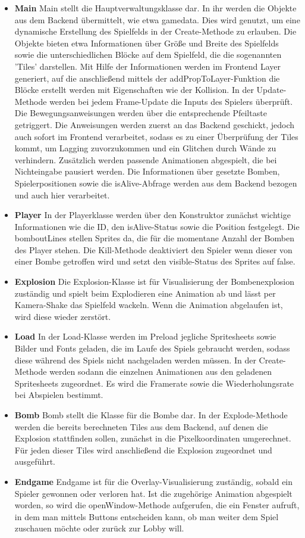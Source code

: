 \documentclass[conference]{IEEEtran}
\begin{document}
\begin{itemize}
    \item \textbf{Main}
    Main stellt die Hauptverwaltungsklasse dar. In ihr werden die Objekte aus dem Backend übermittelt, wie etwa gamedata. Dies wird genutzt, um eine dynamische Erstellung des Spielfelds in der Create-Methode zu erlauben. Die Objekte bieten etwa Informationen über Größe und Breite des Spielfelds sowie die unterschiedlichen Blöcke auf dem Spielfeld, die die sogenannten 'Tiles' darstellen. Mit Hilfe der Informationen werden im Frontend Layer generiert, auf die anschließend mittels der addPropToLayer-Funktion die Blöcke erstellt werden mit Eigenschaften wie der Kollision. In der Update-Methode werden bei jedem Frame-Update die Inputs des Spielers überprüft. Die Bewegungsanweisungen werden über die entsprechende Pfeiltaste getriggert. Die Anweisungen werden zuerst an das Backend geschickt, jedoch auch sofort im Frontend verarbeitet, sodass es zu einer Überprüfung der Tiles kommt, um Lagging zuvorzukommen und ein Glitchen durch Wände zu verhindern. Zusätzlich werden passende Animationen abgespielt, die bei Nichteingabe pausiert werden. Die Informationen über gesetzte Bomben, Spielerpositionen sowie die isAlive-Abfrage werden aus dem Backend bezogen und auch hier verarbeitet.
    \smallskip
    \item \textbf{Player} 
	In der Playerklasse werden über den Konstruktor zunächst wichtige Informationen wie die ID, den isAlive-Status sowie die Position festgelegt. Die bomboutLines stellen Sprites da, die für die momentane Anzahl der Bomben des Player stehen. Die Kill-Methode deaktiviert den Spieler wenn dieser von einer Bombe getroffen wird und setzt den visible-Status des Sprites auf false.
    \smallskip
    \item \textbf{Explosion}
    Die Explosion-Klasse ist für Visualisierung der Bombenexplosion zuständig und spielt beim Explodieren eine Animation ab und lässt per Kamera-Shake das Spielfeld wackeln. Wenn die Animation abgelaufen ist, wird diese wieder zerstört.
    \smallskip
    \item \textbf{Load}
    In der Load-Klasse werden im Preload jegliche Spritesheets sowie Bilder und Fonts geladen, die im Laufe des Spiels gebraucht werden, sodass diese während des Spiels nicht nachgeladen werden müssen. In der Create-Methode werden sodann die einzelnen Animationen aus den geladenen Spritesheets zugeordnet. Es wird die Framerate sowie die Wiederholungsrate bei Abspielen bestimmt.
    \smallskip
    \item \textbf{Bomb}
    Bomb stellt die Klasse für die Bombe dar. In der Explode-Methode werden die bereits berechneten Tiles aus dem Backend, auf denen die Explosion stattfinden sollen, zunächst in die Pixelkoordinaten umgerechnet. Für jeden dieser Tiles wird anschließend die Explosion zugeordnet und ausgeführt.
    \smallskip
    \item \textbf{Endgame}
        Endgame ist für die Overlay-Visualisierung zuständig, sobald ein Spieler gewonnen oder verloren hat. Ist die zugehörige Animation abgespielt worden, so wird die openWindow-Methode aufgerufen, die ein Fenster aufruft, in dem man mittels Buttons entscheiden kann, ob man weiter dem Spiel zuschauen möchte oder zurück zur Lobby will.
\end{itemize}
\end{document}
